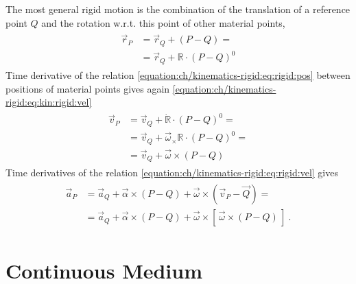 \documentclass[letterpaper,10pt,english]{jupyterBook}
\begin{document}
\sphinxAtStartPar
{}
The most general rigid motion is the combination of the translation of a reference point \(Q\) and the rotation w.r.t. this point of other material points,
\begin{equation}\label{equation:ch/kinematics-rigid:eq:rigid:pos}
\begin{split}\begin{aligned}
  \vec{r}_P
  & = \vec{r}_Q + (P - Q) = \\
  & = \vec{r}_Q + \mathbb{R} \cdot (P-Q)^0 
\end{aligned}\end{split}
\end{equation}
\sphinxAtStartPar
{}
Time derivative of the relation \eqref{equation:ch/kinematics-rigid:eq:rigid:pos} between positions of material points gives again \eqref{equation:ch/kinematics-rigid:eq:kin:rigid:vel}
\begin{equation}\label{equation:ch/kinematics-rigid:eq:rigid:vel}
\begin{split}\begin{aligned}
  \vec{v}_P
  & = \vec{v}_Q + \dot{\mathbb{R}} \cdot (P-Q)^0 = \\
  & = \vec{v}_Q + \vec{\omega}_{\times} \mathbb{R} \cdot (P-Q)^0 = \\
  & = \vec{v}_Q + \vec{\omega} \times (P-Q)
\end{aligned}\end{split}
\end{equation}
\sphinxAtStartPar
{}
Time derivatives of the relation \eqref{equation:ch/kinematics-rigid:eq:rigid:vel} gives
\begin{equation*}
\begin{split}\begin{aligned}
\vec{a}_P 
 & = \vec{a}_Q + \vec{\alpha} \times (P-Q) + \vec{\omega} \times \left( \vec{v}_P - \vec{Q} \right) = \\
 & = \vec{a}_Q + \vec{\alpha} \times (P-Q) + \vec{\omega} \times \left[ \, \vec{\omega} \times (P - Q) \, \right] \ .
\end{aligned}\end{split}
\end{equation*}


\sphinxstepscope


\section{Continuous Medium}
\label{\detokenize{ch/kinematics-continuum:continuous-medium}}\label{\detokenize{ch/kinematics-continuum:classical-mechanics-kinematics-contiuum}}\label{\detokenize{ch/kinematics-continuum::doc}}
\sphinxstepscope
\end{document}
